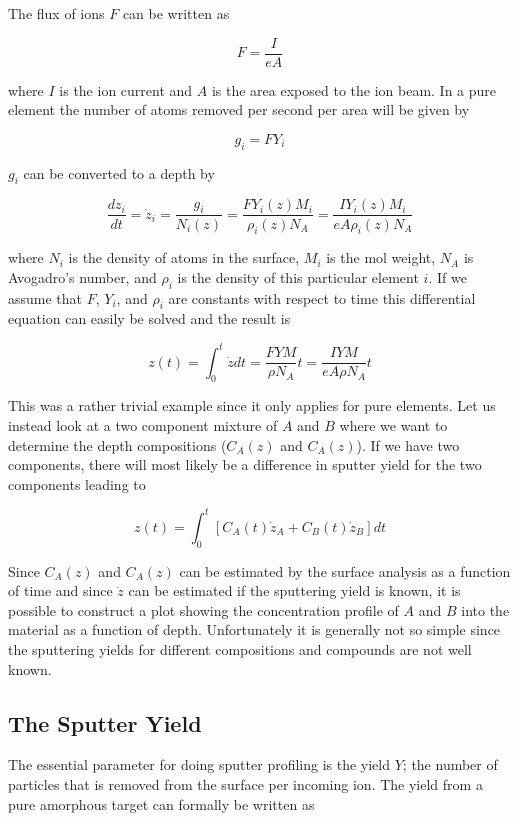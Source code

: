 The flux of ions $F$ can be written as
 
\begin{equation}
F=\frac{I}{eA}
\end{equation}

where $I$ is the ion current and $A$ is the area exposed to the ion beam. In a pure element the number of atoms removed per second per area will be given by

\begin{equation}
g_i=FY_i
\end{equation}

$g_i$ can be converted to a depth by

\begin{equation}
\frac{dz_i}{dt}=\dot{z}_i=\frac{g_i}{N_i(z)}=\frac{FY_i(z)M_i}{\rho_i(z)N_A}=\frac{IY_i(z)M_i}{eA\rho_i(z)N_A}
\end{equation}

where $N_i$ is the density of atoms in the surface, $M_i$ is the mol weight, $N_A$ is Avogadro's number, and $\rho_i$ is the density of this particular element $i$. If we assume that $F$, $Y_i$, and $\rho_i$ are constants with respect to time this differential equation can easily be solved and the result is

\begin{equation}\label{eq:sputterdepth}
z(t)=\int_0^t\dot{z}dt=\frac{FYM}{\rho N_A}t=\frac{IYM}{eA\rho N_A}t
\end{equation}

This was a rather trivial example since it only applies for pure elements. Let us instead look at a two component mixture of $A$ and $B$ where we want to determine the depth compositions ($C_A(z)$ and $C_A(z)$). If we have two components, there will most likely be a difference in sputter yield for the two components leading to

\begin{equation}
z(t)=\int_0^t[C_A(t)\dot{z}_A+C_B(t)\dot{z}_B]dt 
\end{equation}

Since $C_A(z)$ and $C_A(z)$ can be estimated by the surface analysis as a function of time and since $\dot{z}$ can be estimated if the sputtering yield is known, it is possible to construct a plot showing the concentration profile of $A$ and $B$ into the material as a function of depth. Unfortunately it is generally not so simple since the sputtering yields for different compositions and compounds are not well known.

\subsection{The Sputter Yield}
The essential parameter for doing sputter profiling is the yield $Y$; the number of particles that is removed from the surface per incoming ion. The yield from a pure amorphous target can formally be written as

